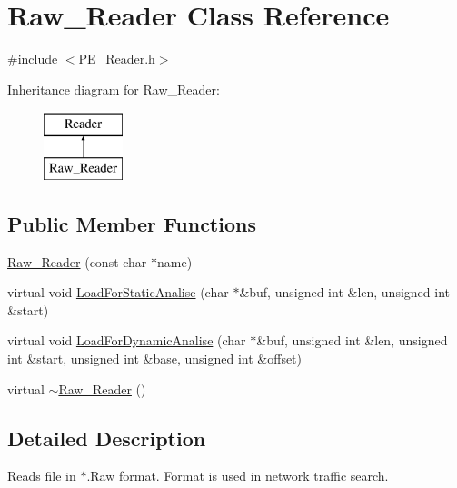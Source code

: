 \hypertarget{classRaw__Reader}{
\section{Raw\_\-Reader Class Reference}
\label{classRaw__Reader}
}


{\ttfamily \#include $<$PE\_\-Reader.h$>$}

Inheritance diagram for Raw\_\-Reader:\begin{figure}[H]
\begin{center}
\leavevmode
\includegraphics[height=2cm]{classRaw__Reader}
\end{center}
\end{figure}
\subsection*{Public Member Functions}
\begin{DoxyCompactItemize}
\item 
\hyperlink{classRaw__Reader_ae75aca0f781eca8af23e5ac27fa89aae}{Raw\_\-Reader} (const char $\ast$name)
\item 
virtual void \hyperlink{classRaw__Reader_a135e1dd4eadb2afaf201002d5402f21e}{LoadForStaticAnalise} (char $\ast$\&buf, unsigned int \&len, unsigned int \&start)
\item 
virtual void \hyperlink{classRaw__Reader_a9e9a6cafa1b830d5c05b7a5e720c656c}{LoadForDynamicAnalise} (char $\ast$\&buf, unsigned int \&len, unsigned int \&start, unsigned int \&base, unsigned int \&offset)
\item 
virtual \hyperlink{classRaw__Reader_a146ea047af0f0319ada57c5e5768992e}{$\sim$Raw\_\-Reader} ()
\end{DoxyCompactItemize}


\subsection{Detailed Description}
Reads file in $\ast$.Raw format. Format is used in network traffic search. 

